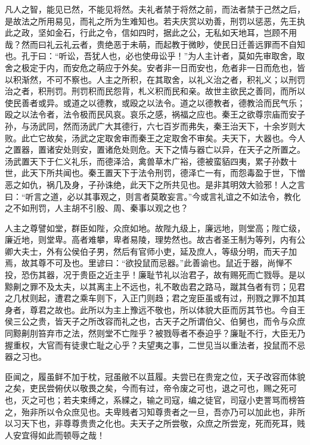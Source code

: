 \documentclass[UTF8,titlepage,oneside]{ctexbook}
\begin{document}
凡人之智，能见已然，不能见将然。夫礼者禁于将然之前，而法者禁于己然之后，是故法之所用易见，而礼之所为生难知也。若夫庆赏以劝善，刑罚以惩恶，先王执此之政，坚如金石，行此之令，信如四时，据此之公，无私如天地耳，岂顾不用哉？然而曰礼云礼云者，贵绝恶于未萌，而起教于微眇，使民日迁善远罪而不自知也。孔于曰：“听讼，吾犹人也，必也使毋讼乎！”为人主计者，莫如先审取舍，取舍之极定于内，而安危之萌应于外矣。安者非一日而安也，危者非一日而危也，皆以积渐然，不可不察也。人主之所积，在其取舍，以礼义治之者，积礼义；以刑罚治之者，积刑罚。刑罚积而民怨背，札义积而民和亲。故世主欲民之善同，而所以使民善者或异。或道之以德教，或殴之以法令。道之以德教者，德教洽而民气乐；殴之以法令者，法令极而民风哀。哀乐之感，祸福之应也。秦王之欲尊宗庙而安子孙，与汤武同，然而汤武广大其德行，六七百岁而弗失，秦王治天下，十余岁则大败。此亡它故矣，汤武之定取舍审而秦王之定取舍不审矣。夫天下，大器也。今人之置器，置诸安处则安，置诸危处则危。天下之情与器亡以异，在天子之所置之。汤武置天下于仁义礼乐，而德泽洽，禽兽草木广裕，德被蛮貊四夷，累子孙数十世，此天下所共闻也。秦王置天下于法令刑罚，德泽亡一有，而怨毒盈于世，下憎恶之如仇，祸几及身，子孙诛绝，此天下之所共见也。是非其明效大验邪！人之言曰：“听言之道，必以其事观之，则言者莫敢妄言。”今或言礼谊之不如法令，教化之不如刑罚，人主胡不引殷、周、秦事以观之也？


人主之尊譬如堂，群臣如陛，众庶如地。故陛九级上，廉远地，则堂高；陛亡级，廉近地，则堂卑。高者难攀，卑者易陵，理势然也。故古者圣王制为等列，内有公卿大夫士，外有公侯伯子男，然后有官师小吏，延及庶人，等级分明，而天子加焉，故其尊不可及也。里谚曰：“欲投鼠而忌器。”此善谕也。鼠近于器，尚惮不投，恐伤其器，况于贵臣之近主乎！廉耻节礼以治君子，故有赐死而亡戮辱。是以黥劓之罪不及太夫，以其离主上不远也，礼不敢齿君之路马，蹴其刍者有罚；见君之几杖则起，遭君之乘车则下，入正门则趋；君之宠臣虽或有过，刑戮之罪不加其身者，尊君之故也。此所以为主上豫远不敬也，所以体貌大臣而厉其节也。今自王侯三公之贵，皆天子之所改容而礼之也，古天子之所谓伯父、伯舅也，而令与众庶同黥劓刖笞弃市之法，然则堂不亡陛乎？被戮辱者不泰迫乎？廉耻不行，大臣无乃握重权，大官而有徒隶亡耻之心乎？夫望夷之事，二世见当以重法者，投鼠而不忌器之习也。


臣闻之，履虽鲜不加于枕，冠虽敝不以苴履。夫尝已在贵宠之位，天子改容而体貌之矣，吏民尝俯伏以敬畏之矣，今而有过，帝令废之可也，退之可也，赐之死可也，灭之可也；若夫束缚之，系緤之，输之司寇，编之徒官，司寇小吏詈骂而榜笞之，殆非所以令众庶见也。夫卑贱者习知尊贵者之一旦，吾亦乃可以加此也，非所以习天下也，非尊尊贵贵之化也。夫天子之所尝敬，众庶之所尝宠，死而死耳，贱人安宜得如此而顿辱之哉！
\end{document}
